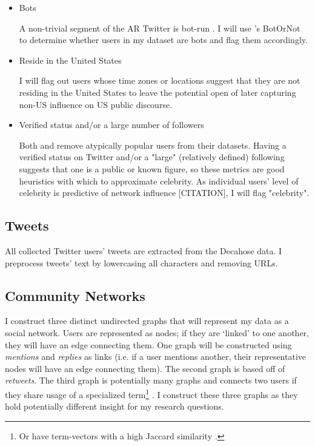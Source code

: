 \documentclass[acmlarge, screen, authorversion]{acmart}
\begin{document}
    \begin{itemize}
        \item Bots
        
            A non-trivial segment of the AR Twitter is bot-run \cite{bergerAltrightTwitterCensus2018}. I will use \citet{davisBotOrNotSystemEvaluate2016}'s BotOrNot to determine whether users in my dataset are bots and flag them accordingly.
            
        \item Reside in the United States
        
            I will flag out users whose time zones or locations suggest that they are not residing in the United States to leave the potential open of later capturing non-US influence on US public discourse.
        
        \item Verified status and/or a large number of followers
            
            Both \citet{bergerAltrightTwitterCensus2018} and \citet{alizadehPsychologyMoralityPolitical2019} remove atypically popular users from their datasets. Having a verified status on Twitter and/or a "large" (relatively defined) following suggests that one is a public or known figure, so these metrics are good heuristics with which to approximate celebrity. As individual users' level of celebrity is predictive of network influence [CITATION], I will flag "celebrity".
        
    \end{itemize}
    
\subsection{Tweets}

    All collected Twitter users' tweets are extracted from the Decahose data. I preprocess tweets' text by lowercasing all characters and removing URLs. 
    
\subsection{Community Networks}

I construct three distinct undirected graphs that will represent my data as a social network. Users are represented as nodes; if they are `linked' to one another, they will have an edge connecting them. One graph will be constructed using \textit{mentions} and \textit{replies} as links (i.e. if a user mentions another, their representative nodes will have an edge connecting them). The second graph is based off of \textit{retweets}. The third graph is potentially many graphs and connects two users if they share usage of a specialized term\footnote{Or have term-vectors with a high Jaccard similarity \cite{niwattanakulUsingJaccardCoefficient2013}.} . I construct these three graphs as they hold potentially different insight for my research questions. 
\end{document}
